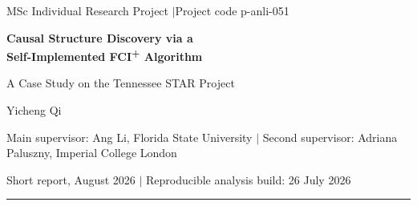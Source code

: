 \documentclass[11pt,a4paper]{article}
\newcommand{\FCIplus}{FCI\textsuperscript{+}}
\begin{document}
\thispagestyle{empty}

\begin{center}
{\small\textcolor{ReportGrey}{MSc Individual Research Project \quad$\vert$\quad Project code p-anli-051}}

\vspace{1.2ex}
{\LARGE\bfseries\color{ReportNavy} Causal Structure Discovery via a\\[0.3ex]
Self-Implemented \FCIplus{} Algorithm\par}

\vspace{0.8ex}
{\large\color{ReportNavy} A Case Study on the Tennessee STAR Project\par}

\vspace{1.4ex}
{\normalsize Yicheng Qi\par}

\vspace{0.6ex}
{\small\textcolor{ReportGrey}%
{Main supervisor: Ang Li, Florida State University \quad$\vert$\quad
 Second supervisor: Adriana Paluszny, Imperial College London}\par}

\vspace{0.4ex}
{\small\textcolor{ReportGrey}{Short report, August 2026 \quad$\vert$\quad
 Reproducible analysis build: 26 July 2026}\par}
\end{center}

\vspace{0.6ex}
\hrule
\vspace{1.4ex}
\end{document}
